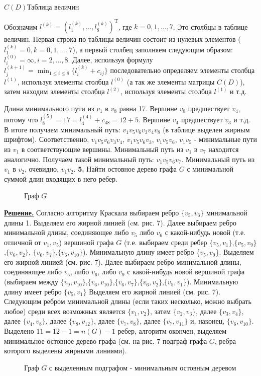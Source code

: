 \documentclass[12pt, letterpaper, titlepage]{article}
\begin{document}
\hspace{3.5cm}$C(D)$\hspace{6.5cm}Таблица величин

Обозначим $l^{(k)}=(l_1^{(k)},\dots,l_8^{(k)})^\mathrm{T}$, где $k=0,1,\dots,7$. Это столбцы в
таблице величин. Первая строка по таблицы величин состоит из нулевых элементов ($l^{(k)}_1=0,k=0,1,\dots,7$),
а первый столбец заполняем следующим образом: $l_i^{(0)}=\infty,i=2,\dots,8$. Далее, используя формулу
$l_j^{(k+1)}=\displaystyle\min_{1\le i\le8}\{l_i^{(k)}+c_{ij}\}$ последовательно определяем элементы столбца
$l^{(1)}$, используя элементы столбца $l^{(0)}$ (а так же элементы матрицы $C(D)$), затем находим элементы
столбца $l^{(2)}$, используя элементы столбца $l^{(1)}$ и т.д.

Длина минимального пути из $v_1$ в $v_8$ равна 17. Вершине $v_8$ предшествует $v_4$, потому что $l^{(5)}_8=17=l^{(4)}_4+c_{48}=12+5$.
Вершине $v_4$ предшествует $v_3$ и т.д. В итоге получаем минимальный путь: $v_1v_5v_6v_3v_4v_8$ (в таблице выделен жирным шрифтом). Соответственно,
$v_1v_5v_6v_3v_4$, $v_1v_5v_6v_3$, $v_1v_5v_6$, $v_1v_5$ - минимальные пути из $v_1$ в соответствующие вершины.
Минимальный путь из $v_1$ в $v_7$ находится аналогично. Получаем такой минимальный путь: $v_1v_5v_6v_7$.
Минимальный путь из $v_1$ в $v_2$, очевидно, $v_1v_2$.
\newpage
\textbf{5.}  Найти остовное дерево графа $G$ с минимальной суммой длин входящих в него ребер.
\begin{figure}[H]\centering\caption{Граф $G$}\end{figure}
\underline{\textbf{Решение.}}
Согласно алгоритму Краскала выбираем ребро $\{v_5,v_6\}$ минимальной длины 1.
Выделяем его жирной линией (cм. рис. 7). Далее выбираем ребро минимальной длины,
соединяющее либо $v_5$ либо $v_6$ с какой-нибудь новой (т.е. отличной от $v_1,v_5$) вершиной
графа $G$ (т.е. выбираем среди ребер $\{v_5,v_1\}$,$\{v_5,v_9\}$,$\{v_6,v_2\}$,
$\{v_6,v_7\}$,$\{v_6,v_{10}\}$). Минимальную длину имеет ребро \{$v_5,v_9$\}. Выделяем его жирной линией (см. рис. 7).
Далее выбираем ребро минимальной длины, соединяющее либо $v_5$, либо $v_6$, либо $v_9$ с какой-нибудь новой
вершиной графа (выбираем между $\{v_9,v_{10}\}$,$\{v_6,v_{10}\}$,$\{v_6,v_7\}$,$\{v_6,v_2\}$,$\{v_5,v_1\}$).
Минимальную длину имеет ребро $\{v_5,v_1\}$ Выделяем его жирной линией (см. рис. 7).
Следующим ребром минимальной длины (если таких несколько, можно выбрать любое) среди всех возможных является $\{v_{1},v_{2}\}$, затем $\{v_{2},v_{3}\}$,
далее $\{v_{3},v_{4}\}$, далее $\{v_4,v_8\}$, далее $\{v_8,v_{12}\}$, далее $\{v_7,v_8\}$, далее $\{v_7,v_{11}\}$ и, наконец, $\{v_6,v_{10}\}$.
Выделено $11 = 12-1 = n(G)-1$ ребер, алгоритм окончен, выделяем минимальное остовное дерево графа (см. на рис. 7 подграф графа $G$, ребра которого выделены жирными линиями).
\begin{figure}[H]\centering\caption{Граф $G$ с выделенным подграфом - минимальным остовным деревом}\end{figure}
\end{document}

